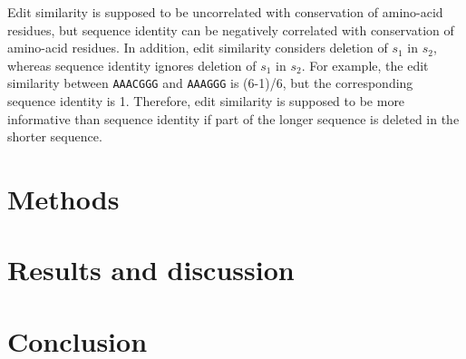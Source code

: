 \documentclass[]{article}
\begin{document}
Edit similarity is supposed to be uncorrelated with conservation of amino-acid residues, but sequence identity can be negatively correlated with conservation of amino-acid residues.
In addition, edit similarity considers deletion of \(s_1\) in \(s_2\), whereas sequence identity ignores deletion of \(s_1\) in \(s_2\).
For example, the edit similarity between \texttt{AAACGGG} and \texttt{AAAGGG} is (6-1)/6, but the corresponding sequence identity is 1. Therefore, edit similarity is supposed to be more informative than sequence identity if part of the longer sequence is deleted in the shorter sequence.

\section{Methods}



\section{Results and discussion}



\section{Conclusion}



\end{document}
